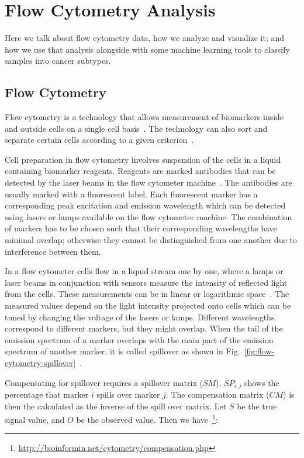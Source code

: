 \chapter{Flow Cytometry Analysis}

Here we talk about flow cytometry data, how we analyze and visualize it; and how we use that analysis alongside with some machine learning tools to classify samples into cancer subtypes.

\section{Flow Cytometry}
Flow cytometry is a technology that allows measurement of biomarkers inside and outside cells on a single cell basis~\cite{flow-cytometry}. The technology can also sort and separate certain cells according to a given criterion~\cite{flow-cytometry-sorting}.

Cell preparation in flow cytometry involves suspension of the cells in a liquid containing biomarker reagents. Reagents are marked antibodies that can be detected by the laser beams in the flow cytometer machine~\cite{flow-cytometry-cell-preparation}. The antibodies are usually marked with a fluorescent label. Each fluorescent marker has a corresponding peak excitation and emission wavelength which can be detected using lasers or lamps available on the flow cytometer machine. The combination of markers has to be chosen such that their corresponding wavelengths have minimal overlap; otherwise they cannot be distinguished from one another due to interference between them.

In a flow cytometer cells flow in a liquid stream one by one, where a lamps or laser beams in conjunction with sensors measure the intensity of reflected light from the cells. These measurements can be in linear or logarithmic space~\cite{practical-flow-cytometry-book}. The measured values depend on the light intensity projected onto cells which can be tuned by changing the voltage of the lasers or lamps. Different wavelengths correspond to different markers, but they might overlap. When the tail of the emission spectrum of a marker overlaps with the main part of the emission spectrum of another marker, it is called spillover as shown in Fig.~\ref{fig:flow-cytometry-spillover}~\cite{flow-cytometry-compensation}.

Compensating for spillover requires a spillover matrix ($SM$). $SP_{i,j}$ shows the percentage that marker $i$ spills over marker $j$. The compensation matrix ($CM$) is then the calculated as the inverse of the spill over matrix. Let $S$ be the true signal value, and $O$ be the observed value. Then we have~\footnote{\url{http://bioinformin.net/cytometry/compensation.php}}:

